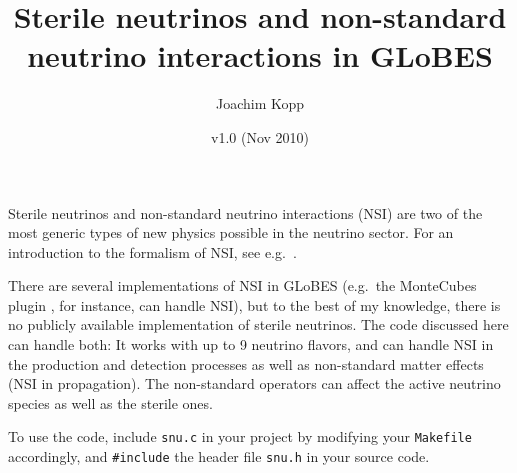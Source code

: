 \documentclass{article}
\title{Sterile neutrinos and non-standard neutrino interactions in GLoBES}
\author{Joachim Kopp}
\date{v1.0 (Nov 2010)}
\begin{document}
\maketitle

Sterile neutrinos and non-standard neutrino interactions (NSI) are two of
the most generic types of new physics possible in the neutrino sector.
For an introduction to the formalism of NSI, see e.g.\ \cite{Kopp:2007ne}.

There are several implementations of NSI in GLoBES (e.g.\ the MonteCubes plugin
\cite{Blennow:2009pk}, for instance, can handle NSI), but to the best of
my knowledge, there is no publicly available implementation of sterile neutrinos.
The code discussed here can handle both: It works with up to 9 neutrino flavors,
and can handle NSI in the production and detection processes as well as
non-standard matter effects (NSI in propagation). The non-standard operators
can affect the active neutrino species as well as the sterile ones.

To use the code, include {\tt snu.c} in your project by modifying your
{\tt Makefile} accordingly, and {\tt \#include} the header file {\tt snu.h}
in your source code.
\end{document}
